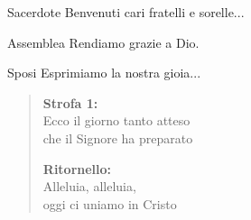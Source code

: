 \begin{dialoghi}
\item[Sacerdote] Benvenuti cari fratelli e sorelle...
\item[Assemblea] Rendiamo grazie a Dio.
\item[Sposi] Esprimiamo la nostra gioia...
\end{dialoghi}

\begin{verse}
	\begin{mystrofe}
		\textbf{Strofa 1:} \\
		Ecco il giorno tanto atteso \\
		che il Signore ha preparato
	\end{mystrofe}

	\begin{myritornello}
		\textbf{Ritornello:} \\
		Alleluia, alleluia, \\
		oggi ci uniamo in Cristo
	\end{myritornello}
\end{verse}